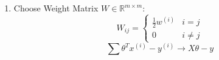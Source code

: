 \begin{answer}
\begin{enumerate}
	\item 
	Choose Weight Matrix $W \in \mathbb{R}^{m \times m}$:
	\begin{equation*}
	W_{ij} = 
	\begin{cases} 
	\frac{1}{2} w^{(i)} & i = j \\ 
	0 & i \neq j 
	\end{cases}
	\end{equation*}
	\begin{equation*}
	\sum \theta ^T x^{(i)} - y^{(i)} \rightarrow X \theta -y
	\end{equation*}
\end{enumerate}
\end{answer}
